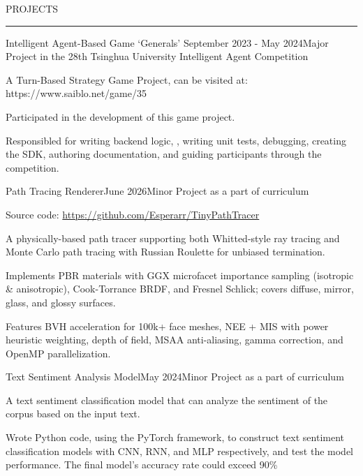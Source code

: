 \documentclass{resume} %
\renewenvironment{rSection}[1]{
\sectionskip
\textcolor{TsinghuaPurple}{\MakeUppercase{#1}}
\sectionlineskip
\hrule
\begin{list}{}{
\setlength{\leftmargin}{0em}
}
\item[]
}{
\end{list}
}
\begin{document}
\begin{rSection}{PROJECTS}

\begin{rSubsection}{Intelligent Agent-Based Game ‘Generals’} {September 2023 - May 2024}{Major Project in the 28th Tsinghua University Intelligent Agent Competition}{}

\item A Turn-Based Strategy Game Project, can be visited at: https://www.saiblo.net/game/35
\item Participated in the development of this game project.
\item Responsibled for writing backend logic, , writing unit tests, debugging, creating the SDK, authoring documentation, and guiding participants through the competition. 
 
\end{rSubsection}  


\begin{rSubsection}{Path Tracing Renderer}{June 2026}{Minor Project as a part of curriculum}{}
\item Source code: \url{https://github.com/Esperarr/TinyPathTracer}
\item A physically-based path tracer supporting both Whitted-style ray tracing and Monte Carlo path tracing with Russian Roulette for unbiased termination.
\item Implements PBR materials with GGX microfacet importance sampling (isotropic \& anisotropic), Cook-Torrance BRDF, and Fresnel Schlick; covers diffuse, mirror, glass, and glossy surfaces.
\item Features BVH acceleration for 100k+ face meshes, NEE + MIS with power heuristic weighting, depth of field, MSAA anti-aliasing, gamma correction, and OpenMP parallelization.
\end{rSubsection}


\begin{rSubsection}{Text Sentiment Analysis Model}{May 2024}{Minor Project as a part of curriculum}{} 
\item A text sentiment classification model that can analyze the sentiment of the corpus based on the input text.
\item Wrote Python code, using the PyTorch framework, to construct text sentiment classification models with CNN, RNN, and MLP respectively, and test the model performance. The final model’s accuracy rate could exceed 90\%  


\end{rSubsection}
\end{rSection}
\end{document}
